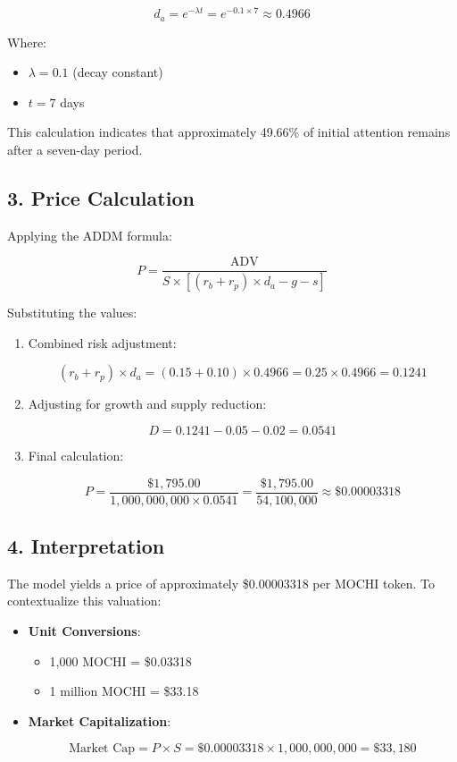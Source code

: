 \documentclass[a4paper,12pt]{article}
\begin{document}
\[
d_a = e^{-\lambda t} = e^{-0.1 \times 7} \approx 0.4966
\]

Where:

\begin{itemize}
    \item \( \lambda = 0.1 \) (decay constant)
    \item \( t = 7 \) days
\end{itemize}

This calculation indicates that approximately 49.66\% of initial attention remains after a seven-day period.

\subsection*{3. Price Calculation}
Applying the ADDM formula:

\[
P = \frac{\text{ADV}}{S \times \left[ (r_b + r_p) \times d_a - g - s \right]}
\]

Substituting the values:

\begin{enumerate}
    \item Combined risk adjustment:

    \[
    (r_b + r_p) \times d_a = (0.15 + 0.10) \times 0.4966 = 0.25 \times 0.4966 = 0.1241
    \]

    \item Adjusting for growth and supply reduction:

    \[
    D = 0.1241 - 0.05 - 0.02 = 0.0541
    \]

    \item Final calculation:

    \[
    P = \frac{\$1,795.00}{1,000,000,000 \times 0.0541} = \frac{\$1,795.00}{54,100,000} \approx \$0.00003318
    \]
\end{enumerate}

\subsection*{4. Interpretation}
The model yields a price of approximately \$0.00003318 per MOCHI token. To contextualize this valuation:

\begin{itemize}
    \item \textbf{Unit Conversions}:

    \begin{itemize}
        \item 1,000 MOCHI = \$0.03318
        \item 1 million MOCHI = \$33.18
    \end{itemize}

    \item \textbf{Market Capitalization}:

    \[
    \text{Market Cap} = P \times S = \$0.00003318 \times 1,000,000,000 = \$33,180
    \]
\end{itemize}
\end{document}
